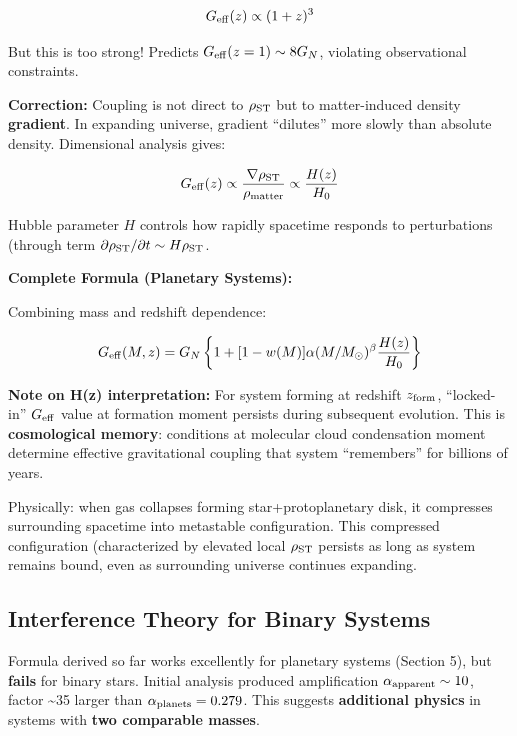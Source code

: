 \documentclass[11pt,a4paper]{article}
\begin{document}
\[G_{\rm eff}(z) \propto (1+z)^3\]

But this is too strong! Predicts \(G_{\rm eff}(z=1) \sim 8 G_N\),
violating observational constraints.

\textbf{Correction:} Coupling is not direct to \(\rho_{\rm ST}\) but to
matter-induced density \textbf{gradient}. In expanding universe,
gradient ``dilutes'' more slowly than absolute density. Dimensional
analysis gives:

\[G_{\rm eff}(z) \propto \frac{\nabla \rho_{\rm ST}}{\rho_{\rm matter}} \propto \frac{H(z)}{H_0}\]

Hubble parameter \(H\) controls how rapidly spacetime responds to
perturbations (through term
\(\partial \rho_{\rm ST}/\partial t \sim H \rho_{\rm ST}\).

\textbf{Complete Formula (Planetary Systems):}

Combining mass and redshift dependence:

\[G_{\rm eff}(M,z) = G_N \left\{1 + [1-w(M)] \alpha (M/M_\odot)^\beta \frac{H(z)}{H_0}\right\}\]

\textbf{Note on H(z) interpretation:} For system forming at redshift
\(z_{\rm form}\), ``locked-in'' \(G_{\rm eff}\) value at formation
moment persists during subsequent evolution. This is
\textbf{cosmological memory}: conditions at molecular cloud condensation
moment determine effective gravitational coupling that system
``remembers'' for billions of years.

Physically: when gas collapses forming star+protoplanetary disk, it
compresses surrounding spacetime into metastable configuration. This
compressed configuration (characterized by elevated local
\(\rho_{\rm ST}\) persists as long as system remains bound, even as
surrounding universe continues expanding.

\hypertarget{interference-theory-for-binary-systems}{%
\subsection{Interference Theory for Binary
Systems}\label{interference-theory-for-binary-systems}}

Formula derived so far works excellently for planetary systems (Section
5), but \textbf{fails} for binary stars. Initial analysis produced
amplification \(\alpha_{\rm apparent} \sim 10\), factor
\textasciitilde35 larger than \(\alpha_{\rm planets} = 0.279\). This
suggests \textbf{additional physics} in systems with \textbf{two
comparable masses}.
\end{document}

